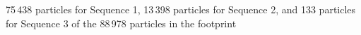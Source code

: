 75\,438 particles for Sequence 1, 13\,398 particles for Sequence 2, and 133 particles for Sequence 3 of the 88\,978 particles in the footprint%
